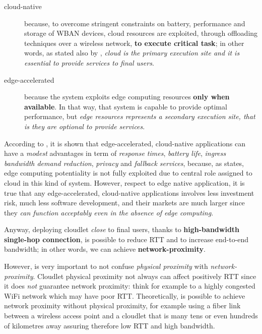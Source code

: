 \documentclass[sigchi]{acmart}
\begin{document}
\begin{description}

\item[cloud-native] because, to overcome stringent constraints on battery, performance and storage of WBAN devices, cloud resources are exploited, through offloading techniques over a wireless network, \textbf{to execute critical task}; in other words, as stated also by \citet{MSAReport}, \textit{cloud is the primary execution site and it is essential to provide services to final users}.

\item[edge-accelerated] because the system exploits edge computing resources \textbf{only when available}. In that way, that system is capable to provide optimal performance, but \textit{edge resources represents a secondary execution site, that is they are optional to provide services}.

\end{description}

According to \citet{TheSeminalRoleEdgeNativeApplications}, it is shown that edge-accelerated, cloud-native applications can have a \textit{modest} advantages in term of \textit{response times}, \textit{battery life}, \textit{ingress bandwidth demand reduction}, \textit{privacy} and \textit{fallback services}\cite{TheSeminalRoleEdgeNativeApplications}\citep{TheEmergenceOfEdgeComputing}, because, as \citet{TheSeminalRoleEdgeNativeApplications} states, edge computing potentiality is not fully exploited due to central role assigned to cloud in this kind of system. However, respect to edge native application, it is true that any edge-accelerated, cloud-native applications involves less investment risk, much less software development, and their markets are much larger since they \textit{can function acceptably even in the absence of edge computing}.

Anyway, deploying cloudlet \textit{close} to final users, thanks to \textbf{high-bandwidth single-hop connection}, is possible to reduce RTT and to increase end-to-end bandwidth; in other words, we can achieve \textbf{network-proximity}.\citep{TheSeminalRoleEdgeNativeApplications}

However, is very important to not confuse \textit{physical proximity} with \textit{network-proximity}. Cloudlet physical proximity not always can affect positively RTT since it does \textit{not} guarantee network proximity: think for example to a highly congested WiFi network which may have poor RTT. Theoretically, is possible to achieve network proximity without physical proximity, for example using a fiber link between a wireless access point and a cloudlet that is many tens or even hundreds of kilometres away assuring therefore low RTT and high bandwidth.\cite{TheSeminalRoleEdgeNativeApplications}
\end{document}
